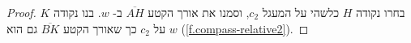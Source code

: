 \begin{proof}
%
%


בחרו נקודה
$H$
כלשהי על המעגל
$c_2$,
וסמנו את אורך הקטע
$\overline{AH}$
ב-%
$w$.
בנו נקודה
$K$
על 
$c_2$
כך שאורך הקטע
$\overline{BK}$
גם הוא
$w$
(\ref{f.compass-relative2}).


\end{proof}
